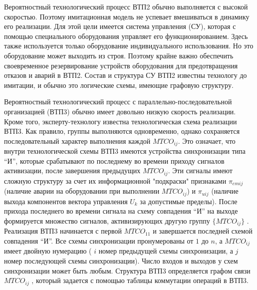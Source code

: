 Вероятностный технологический процесс ВТП2 обычно выполняется с высокой скоростью. Поэтому имитационная модель не успевает вмешиваться в динамику его реализации. Для этой цели имеется система управления (СУ), которая с помощью специального оборудования управляет его функционированием. Здесь также используется только оборудование индивидуального использования. Но это оборудование может выходить из строя. Поэтому крайне важно обеспечить своевременное резервирование устройств оборудования для предотвращения отказов и аварий в ВТП2. Состав и структура СУ ВТП2 известны технологу до имитации, и обычно это логические схемы, имеющие графовую структуру.

Вероятностный технологический процесс с параллельно-последовательной организацией (ВТП3) обычно имеет довольно низкую скорость реализации. Кроме того, эксперту-технологу известна технологическая схема реализации ВТП3. Как правило, группы   выполняются одновременно, однако сохраняется последовательный характер выполнения каждой $MTCO_{ij}$. Это означает, что внутри технологической схемы ВТП3 имеются устройства синхронизации типа ``И'', которые срабатывают по последнему во времени приходу сигналов активизации, после завершения предыдущих $MTCO_{ij}$. Эти сигналы имеют сложную структуру за счет их информационной "подкраски"{} признаками $\pi_{emij}$ (наличие аварии на оборудовании при выполнении  $MTCO_{ij}$) и $\pi_{uij}$ (наличие выхода компонентов вектора управления ${U_k}$ за допустимые пределы). После прихода последнего во времени сигнала на схему совпадения ``И'' на выходе формируется множество сигналов, активизирующих другую группу $\{MTCO_{ij}\}$ . Реализация ВТП3 начинается с первой $MTCO_{11}$ и завершается последней схемой совпадения ``И''. Все схемы синхронизации пронумерованы от $1$ до $n$, а $MTCO_{ij}$ имеет двойную нумерацию ( $i$ номер предыдущей схемы синхронизации, а $j$ номер последующей схемы синхронизации). Число входов и выходов у схем синхронизации может быть любым. Структура ВТП3 определяется графом связи $MTCO_{ij}$ , который задается с помощью таблицы коммутации операций в ВТП3.

